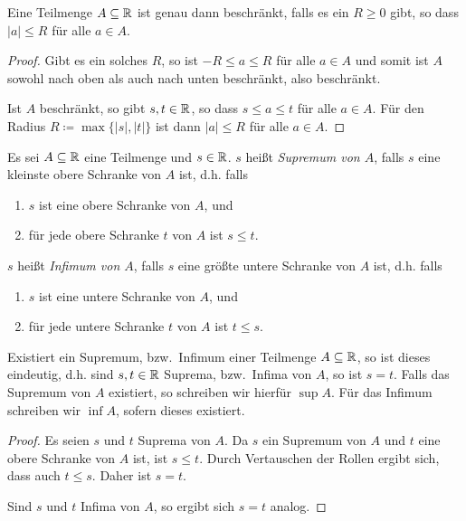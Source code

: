 \documentclass[a4paper,10pt]{article}
\begin{document}
\begin{bem}
 Eine Teilmenge $A \subseteq \mathbb{R}$ ist genau dann beschränkt, falls es ein $R \geq 0$ gibt, so dass $|a| \leq R$ für alle $a \in A$.
\end{bem}
\begin{proof}
 Gibt es ein solches $R$, so ist $-R \leq a \leq R$ für alle $a \in A$ und somit ist $A$ sowohl nach oben als auch nach unten beschränkt, also beschränkt.
 
 Ist $A$ beschränkt, so gibt $s, t \in \mathbb{R}$, so dass $s \leq a \leq t$ für alle $a \in A$. Für den Radius $R \coloneqq \max\{|s|, |t|\}$ ist dann $|a| \leq R$ für alle $a \in A$.
\end{proof}


\begin{defi}
 Es sei $A \subseteq \mathbb{R}$ eine Teilmenge und $s \in \mathbb{R}$. $s$ heißt \emph{Supremum von $A$}, falls $s$ eine kleinste obere Schranke von $A$ ist, d.h. falls
 \begin{enumerate}
  \item
   $s$ ist eine obere Schranke von $A$, und
  \item
   für jede obere Schranke $t$ von $A$ ist $s \leq t$.
 \end{enumerate}
 $s$ heißt \emph{Infimum von $A$}, falls $s$ eine größte untere Schranke von $A$ ist, d.h. falls
 \begin{enumerate}
  \item
   $s$ ist eine untere Schranke von $A$, und
  \item
   für jede untere Schranke $t$ von $A$ ist $t \leq s$.
 \end{enumerate}
\end{defi}


\begin{bem}
 Existiert ein Supremum, bzw.\ Infimum einer Teilmenge $A \subseteq \mathbb{R}$, so ist dieses eindeutig, d.h. sind $s,t \in \mathbb{R}$ Suprema, bzw.\ Infima von $A$, so ist $s = t$. Falls das Supremum von $A$ existiert, so schreiben wir hierfür $\sup A$. Für das Infimum schreiben wir $\inf A$, sofern dieses existiert.
\end{bem}
\begin{proof}
 Es seien $s$ und $t$ Suprema von $A$. Da $s$ ein Supremum von $A$ und $t$ eine obere Schranke von $A$ ist, ist $s \leq t$. Durch Vertauschen der Rollen ergibt sich, dass auch $t \leq s$. Daher ist $s = t$.
 
 Sind $s$ und $t$ Infima von $A$, so ergibt sich $s = t$ analog.
\end{proof}
\end{document}
